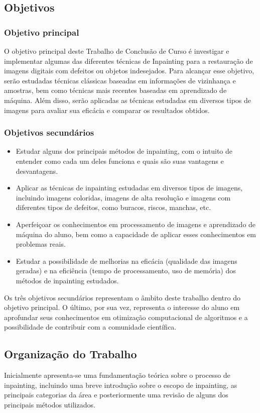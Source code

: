 \subsection{Objetivos}

\subsubsection{Objetivo principal}
O objetivo principal deste Trabalho de Conclusão de Curso é investigar e implementar algumas das diferentes técnicas de Inpainting para a restauração de imagens digitais com defeitos ou objetos indesejados. Para alcançar esse objetivo, serão estudadas técnicas clássicas baseadas em informações de vizinhança e amostras, bem como técnicas mais recentes baseadas em aprendizado de máquina. Além disso, serão aplicadas as técnicas estudadas em diversos tipos de imagens para avaliar sua eficácia e comparar os resultados obtidos.

\subsubsection{Objetivos secundários}
\begin{itemize}
  \item Estudar alguns dos principais métodos de inpainting, com o intuito de entender como cada um deles funciona e quais são suas vantagens e desvantagens.
  \item Aplicar as técnicas de inpainting estudadas em diversos tipos de imagens, incluindo imagens coloridas, imagens de alta resolução e imagens com diferentes tipos de defeitos, como buracos, riscos, manchas, etc.
  \item Aperfeiçoar os conhecimentos em processamento de imagens e aprendizado de máquina do aluno, bem como a capacidade de aplicar esses conhecimentos em problemas reais.
  \item Estudar a possibilidade de melhorias na eficácia (qualidade das imagens geradas) e na eficiência (tempo de processamento, uso de memória) dos métodos de inpainting estudados.
\end{itemize}

Os três objetivos secundários representam o âmbito deste trabalho dentro do objetivo principal. O último, por sua vez, representa o interesse do aluno em aprofundar seus conhecimentos em otimização computacional de algoritmos e a possibilidade de contribuir com a comunidade científica.

\subsection{Organização do Trabalho}
Inicialmente apresenta-se uma fundamentação teórica sobre o processo de inpainting, incluindo uma breve introdução sobre o escopo de inpainting, as principais categorias da área e posteriormente uma revisão de alguns dos principais métodos utilizados.

